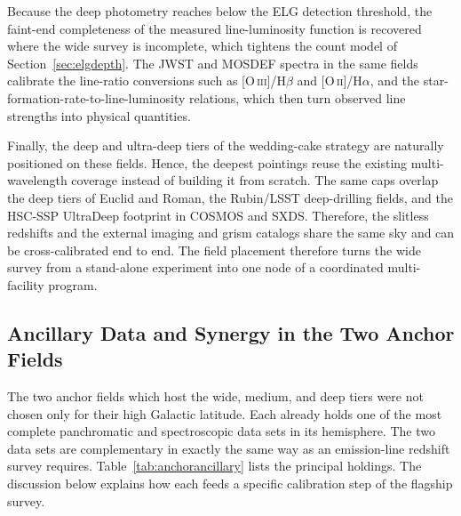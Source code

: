 \documentclass[10pt,onecolumn]{article}
\begin{document}
Because the deep photometry reaches below the ELG detection threshold, the faint-end completeness of the measured line-luminosity function is recovered where the wide survey is incomplete, which tightens the count model of Section~\ref{sec:elgdepth}. The JWST and MOSDEF spectra in the same fields calibrate the line-ratio conversions such as [O\,\textsc{iii}]/H$\beta$ and [O\,\textsc{ii}]/H$\alpha$, and the star-formation-rate-to-line-luminosity relations, which then turn observed line strengths into physical quantities.

Finally, the deep and ultra-deep tiers of the wedding-cake strategy are naturally positioned on these fields. Hence, the deepest pointings reuse the existing multi-wavelength coverage instead of building it from scratch. The same caps overlap the deep tiers of Euclid and Roman, the Rubin/LSST deep-drilling fields, and the HSC-SSP UltraDeep footprint in COSMOS and SXDS. Therefore, the slitless redshifts and the external imaging and grism catalogs share the same sky and can be cross-calibrated end to end. The field placement therefore turns the wide survey from a stand-alone experiment into one node of a coordinated multi-facility program.

\subsection{Ancillary Data and Synergy in the Two Anchor Fields}\label{sec:anchorsynergy}

The two anchor fields which host the wide, medium, and deep tiers were not chosen only for their high Galactic latitude. Each already holds one of the most complete panchromatic and spectroscopic data sets in its hemisphere. The two data sets are complementary in exactly the same way as an emission-line redshift survey requires. Table~\ref{tab:anchorancillary} lists the principal holdings. The discussion below explains how each feeds a specific calibration step of the flagship survey.
\end{document}
